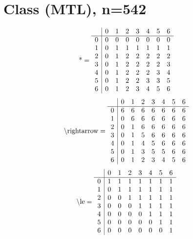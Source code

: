 \documentclass[11pt]{article}
\begin{document}
\section{Class (MTL), n=542}
\[\text{*} = 
\begin{array}{r | r r r r r r r}
 & 0 & 1 & 2 & 3 & 4 & 5 & 6 \\ \hline
0 & 0 & 0 & 0 & 0 & 0 & 0 & 0 \\
1 & 0 & 1 & 1 & 1 & 1 & 1 & 1 \\
2 & 0 & 1 & 2 & 2 & 2 & 2 & 2 \\
3 & 0 & 1 & 2 & 2 & 2 & 2 & 3 \\
4 & 0 & 1 & 2 & 2 & 2 & 3 & 4 \\
5 & 0 & 1 & 2 & 2 & 3 & 3 & 5 \\
6 & 0 & 1 & 2 & 3 & 4 & 5 & 6 \\
\end{array}
\]
\[\text{\textbackslash rightarrow} = 
\begin{array}{r | r r r r r r r}
 & 0 & 1 & 2 & 3 & 4 & 5 & 6 \\ \hline
0 & 6 & 6 & 6 & 6 & 6 & 6 & 6 \\
1 & 0 & 6 & 6 & 6 & 6 & 6 & 6 \\
2 & 0 & 1 & 6 & 6 & 6 & 6 & 6 \\
3 & 0 & 1 & 5 & 6 & 6 & 6 & 6 \\
4 & 0 & 1 & 4 & 5 & 6 & 6 & 6 \\
5 & 0 & 1 & 3 & 5 & 5 & 6 & 6 \\
6 & 0 & 1 & 2 & 3 & 4 & 5 & 6 \\
\end{array}
\]
\[\text{\textbackslash le} = 
\begin{array}{r | r r r r r r r}
 & 0 & 1 & 2 & 3 & 4 & 5 & 6 \\ \hline
0 & 1 & 1 & 1 & 1 & 1 & 1 & 1 \\
1 & 0 & 1 & 1 & 1 & 1 & 1 & 1 \\
2 & 0 & 0 & 1 & 1 & 1 & 1 & 1 \\
3 & 0 & 0 & 0 & 1 & 1 & 1 & 1 \\
4 & 0 & 0 & 0 & 0 & 1 & 1 & 1 \\
5 & 0 & 0 & 0 & 0 & 0 & 1 & 1 \\
6 & 0 & 0 & 0 & 0 & 0 & 0 & 1 \\
\end{array}
\]
\end{document}
